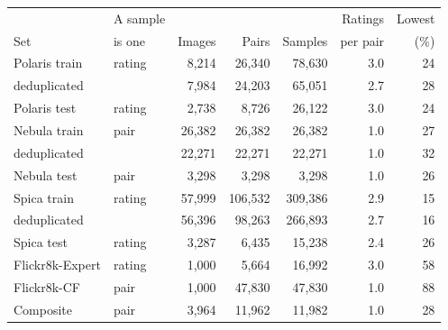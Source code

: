 \begin{tabular}{@{}llrrrrr@{}}
\toprule
& A sample & & & & Ratings & Lowest \\
Set & is one & Images & Pairs & Samples & per pair & (\%) \\
\midrule
Polaris train & rating & 8,214 & 26,340 & 78,630 & 3.0 & 24 \\
\quad deduplicated & & 7,984 & 24,203 & 65,051 & 2.7 & 28 \\
Polaris test & rating & 2,738 & 8,726 & 26,122 & 3.0 & 24 \\
Nebula train & pair & 26,382 & 26,382 & 26,382 & 1.0 & 27 \\
\quad deduplicated & & 22,271 & 22,271 & 22,271 & 1.0 & 32 \\
Nebula test & pair & 3,298 & 3,298 & 3,298 & 1.0 & 26 \\
Spica train & rating & 57,999 & 106,532 & 309,386 & 2.9 & 15 \\
\quad deduplicated & & 56,396 & 98,263 & 266,893 & 2.7 & 16 \\
Spica test & rating & 3,287 & 6,435 & 15,238 & 2.4 & 26 \\
\addlinespace
Flickr8k-Expert & rating & 1,000 & 5,664 & 16,992 & 3.0 & 58 \\
Flickr8k-CF & pair & 1,000 & 47,830 & 47,830 & 1.0 & 88 \\
Composite & pair & 3,964 & 11,962 & 11,982 & 1.0 & 28 \\
\bottomrule
\end{tabular}
